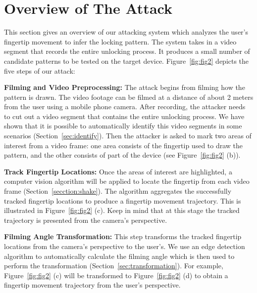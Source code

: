 \section{Overview of The Attack}
\label{section:overview}
     This section gives an overview of our attacking system which analyzes the user's fingertip movement to infer the locking pattern. The system takes in a video segment that records the entire unlocking process. It produces a small number of candidate patterns to be tested on the target device.
    Figure~\ref{fig:fig2} depicts the five steps of our attack:

    \vspace{2mm}
    \noindent {} \textbf{Filming and Video Preprocessing:} The attack begins from
        filming how the pattern is drawn. The video footage can be filmed at a distance of
        about 2 meters from the user using a mobile phone camera. After recording, the attacker
        needs to cut out a video segment that contains the entire unlocking
        process. We have shown that it is possible to automatically identify this video segments in some scenarios (Section~\ref{sec:identify}).
        Then the attacker is asked to mark two areas of interest from a video frame: one area consists of
        the fingertip used to draw the pattern, and the other consists of part of the device (see
    Figure~\ref{fig:fig2} (b)).

     \vspace{2mm}
    \noindent {}  \textbf{Track Fingertip Locations:} Once the areas of interest are highlighted, a computer vision algorithm will be applied
        to locate the fingertip from each video frame (Section~\ref{secction:shake}). The algorithm aggregates the successfully tracked fingertip locations to produce a fingertip movement trajectory.
        This is illustrated in Figure~\ref{fig:fig2} (c). Keep in mind that at this stage the tracked trajectory is presented from the camera's perspective.

     \vspace{2mm}
    \noindent {} \textbf{Filming Angle Transformation:}  This step transforms the tracked fingertip locations from the camera's perspective to the user's.
    We use an edge detection algorithm to automatically calculate the filming angle which is then used to perform the transformation (Section~\ref{sec:transformation}).
    For example, Figure~\ref{fig:fig2} (c) will be transformed to Figure~\ref{fig:fig2} (d) to obtain a fingertip movement trajectory from the user's perspective.

